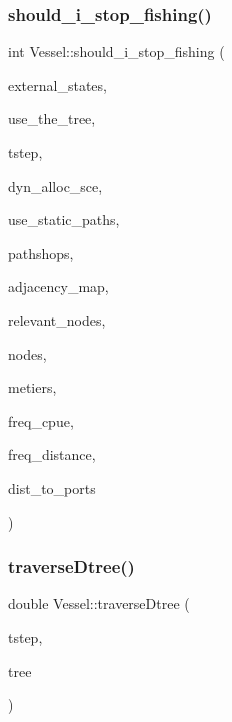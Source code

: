 \subsubsection{\texorpdfstring{should\_i\_stop\_fishing()}{should\_i\_stop\_fishing()}}
{\footnotesize\ttfamily int Vessel\+::should\+\_\+i\+\_\+stop\+\_\+fishing (\begin{DoxyParamCaption}\item[{const std\+::map$<$ std\+::string, int $>$ \&}]{external\+\_\+states,  }\item[{bool}]{use\+\_\+the\+\_\+tree,  }\item[{int}]{tstep,  }\item[{const \mbox{\hyperlink{class_dyn_alloc_options}{Dyn\+Alloc\+Options}} \&}]{dyn\+\_\+alloc\+\_\+sce,  }\item[{int}]{use\+\_\+static\+\_\+paths,  }\item[{const std\+::vector$<$ \mbox{\hyperlink{class_path_shop}{Path\+Shop}} $>$ \&}]{pathshops,  }\item[{\mbox{\hyperlink{myutils_8h_ae689dbcb43e66abf9a513718b83bd87d}{adjacency\+\_\+map\+\_\+t}} \&}]{adjacency\+\_\+map,  }\item[{const vector$<$ \mbox{\hyperlink{classtypes_1_1_node_id}{types\+::\+Node\+Id}} $>$ \&}]{relevant\+\_\+nodes,  }\item[{std\+::vector$<$ \mbox{\hyperlink{class_node}{Node}} $\ast$ $>$ \&}]{nodes,  }\item[{std\+::vector$<$ \mbox{\hyperlink{class_metier}{Metier}} $\ast$ $>$ \&}]{metiers,  }\item[{std\+::ofstream \&}]{freq\+\_\+cpue,  }\item[{std\+::ofstream \&}]{freq\+\_\+distance,  }\item[{std\+::vector$<$ double $>$ \&}]{dist\+\_\+to\+\_\+ports }\end{DoxyParamCaption})}

\mbox{\label{class_vessel_a4416a787bac4131bacb728772c9c1c4b}} 
\subsubsection{\texorpdfstring{traverseDtree()}{traverseDtree()}}
{\footnotesize\ttfamily double Vessel\+::traverse\+Dtree (\begin{DoxyParamCaption}\item[{int}]{tstep,  }\item[{\mbox{\hyperlink{classdtree_1_1_decision_tree}{dtree\+::\+Decision\+Tree}} $\ast$}]{tree }\end{DoxyParamCaption})}



